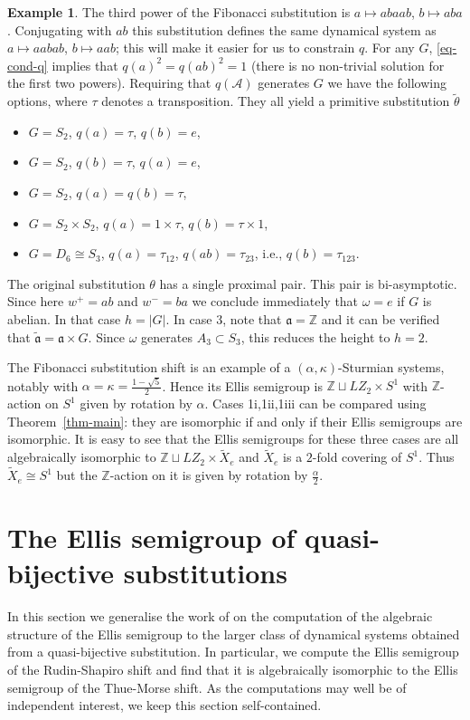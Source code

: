 \documentclass[12pt]{amsart}
\theoremstyle{definition}
\newtheorem{example}[theorem]{Example}
\numberwithin{equation}{section}
\newcommand{\Z}{\mathbb Z}
\newcommand{\Aa}{{\mathcal A}}
\newcommand{\aut}{{\mathfrak a}}
\newcommand{\al}{\alpha}
\newcommand{\cut}{\kappa}
\begin{document}
\begin{example}
The third power of the Fibonacci substitution is $a\mapsto abaab$, $b\mapsto aba$. Conjugating with $ab$ this substitution defines the same dynamical system as $a\mapsto aabab$, $b\mapsto aab$; this will make it easier for us to constrain $q$.
For any $G$, \eqref{eq-cond-q} implies that $q(a)^2=q(ab)^2 = 1$ (there is no non-trivial solution for the first two powers). 
Requiring that $q(\Aa)$ generates $G$ we have the following options, where $\tau$ denotes a transposition. They  all yield a primitive substitution $\tilde\theta$
\begin{itemize}
\item[1i] $G=S_2$, $q(a) = \tau$, $q(b)=e$,
\item[1ii] $G=S_2$, $q(b) = \tau$, $q(a)=e$,
\item[1iii] $G=S_2$, $q(a)=q(b) = \tau$,
\item[2] $G=S_2\times S_2$,  $q(a) = 1\times \tau$, $q(b)=\tau\times 1$,
\item[3] $G=D_6\cong S_3$, $q(a) = \tau_{12}$, $q(ab)=\tau_{23}$, i.e., $q(b)=\tau_{123}$.
\end{itemize}
The original substitution $\theta$ has a single proximal pair. This pair  is bi-asymptotic. Since here $w^+=ab$ and $w^-=ba$ we conclude immediately that $\omega=e$ if $G$ is abelian. In that case $h=|G|$.  In case 3, note that $\aut = \mathbb Z$ and it can be verified that $\tilde\aut = \aut\times G$. Since $\omega$ generates $A_3\subset S_3$, this reduces the height to  $h=2$.

The Fibonacci substitution shift  is an  example of a $(\al,\cut)$-Sturmian systems, notably with $\al=\cut= {\frac{1-\sqrt{5}}2}$. Hence its Ellis semigroup is 
$\Z\sqcup LZ_2\times S^1$ with $\Z$-action on $S^1$ given by rotation by $\al$.
Cases 1i,1ii,1iii can be compared using Theorem~\ref{thm-main}: they are isomorphic if and only if their Ellis semigroups are isomorphic. It is easy to see that the Ellis semigroups for these three cases are all algebraically isomorphic to $\Z\sqcup LZ_2\times \tilde X_e$ and $ \tilde X_e$ is a $2$-fold covering of $S^1$. Thus $ \tilde X_e
\cong S^1$ but the $\Z$-action on it is given by rotation by $\frac{\al}2$.
\end{example}


\section{The Ellis semigroup of quasi-bijective substitutions}\label{ESQB}
In this section we generalise the work of \cite{ESBS} on the computation of the algebraic structure of the Ellis semigroup to the larger class of dynamical systems obtained from a quasi-bijective substitution. In particular, we compute the Ellis semigroup of the Rudin-Shapiro shift and find that it is algebraically isomorphic to the Ellis semigroup of the Thue-Morse shift. As the computations may well be of independent interest, we keep this section self-contained. 
\end{document}
